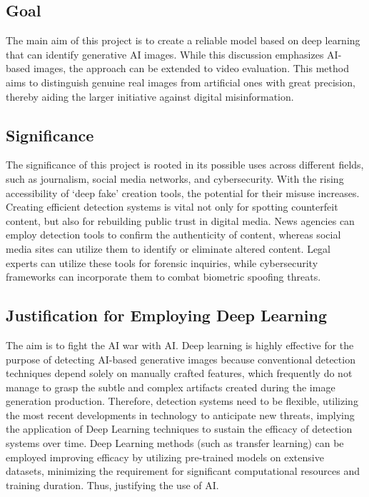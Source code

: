 \documentclass{article} %
\begin{document}
\subsection{Goal}
The main aim of this project is to create a reliable model based on deep learning that can identify generative AI images. While this discussion emphasizes AI-based images, the approach can be extended to video evaluation. 
This method aims to distinguish genuine real images from artificial ones with great precision, thereby aiding the larger initiative against digital misinformation. 

\subsection{Significance}
The significance of this project is rooted in its possible uses across different fields, such as journalism, social media networks, and cybersecurity. With the rising accessibility of `deep fake' creation tools, the potential for their misuse increases. Creating efficient detection systems is vital not only for spotting counterfeit content, but also for rebuilding public trust in digital media. News agencies can employ detection tools to confirm the authenticity of content\citep{Kumarage2023}, whereas social media sites can utilize them to identify or eliminate altered content\citep{cloudflare2023}. Legal experts can utilize these tools for forensic inquiries\citep{cai2023}, while cybersecurity frameworks can incorporate them to combat biometric spoofing threats\citep{techbullion2023}.

\subsection{Justification for Employing Deep Learning}
The aim is to fight the AI war with AI. Deep learning is highly effective for the purpose of detecting AI-based generative images because conventional detection techniques depend solely on manually crafted features, which frequently do not manage to grasp the subtle and complex artifacts created during the image generation production. Therefore, detection systems need to be flexible, utilizing the most recent developments in technology to anticipate new threats, implying the application of Deep Learning techniques to sustain the efficacy of detection systems over time\citep{ledig2017}. Deep Learning methods (such as transfer learning) can be employed improving efficacy by utilizing pre-trained models on extensive datasets, minimizing the requirement for significant computational resources and training duration\citep{srivastava2014}. Thus, justifying the use of AI.
\end{document}

